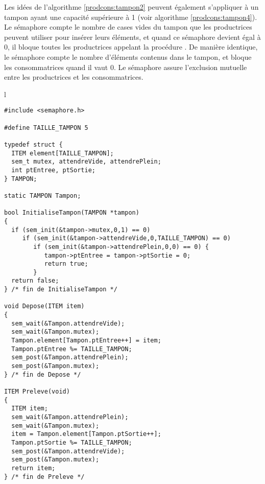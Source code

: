 Les idées de l'algorithme \ref{prodcons:tampon2} peuvent également s'appliquer à un tampon ayant une capacité supérieure à 1 (voir algorithme \ref{prodcons:tampon4}).
Le sémaphore  compte le nombre de cases vides du tampon que les productrices peuvent utiliser pour insérer leurs éléments, et quand ce sémaphore devient égal à 0, il bloque toutes les productrices appelant la procédure .
De manière identique, le sémaphore  compte le nombre d'éléments contenus dans le tampon, et bloque les consommatrices quand il vaut 0. Le sémaphore  assure l'exclusion mutuelle entre les productrices et les consommatrices.

\begin{algorithm}[!ht]
\caption{Extension de l'algorithme \ref{prodcons:tampon2}}\label{prodcons:tampon4}
\begin{center}
\begin{tabular}{l}
\lstset{language=C++}
\begin{lstlisting}
#include <semaphore.h>

#define TAILLE_TAMPON 5

typedef struct {
  ITEM element[TAILLE_TAMPON];
  sem_t mutex, attendreVide, attendrePlein;
  int ptEntree, ptSortie;
} TAMPON;

static TAMPON Tampon;

bool InitialiseTampon(TAMPON *tampon)
{
  if (sem_init(&tampon->mutex,0,1) == 0)
     if (sem_init(&tampon->attendreVide,0,TAILLE_TAMPON) == 0)
        if (sem_init(&tampon->attendrePlein,0,0) == 0) {
           tampon->ptEntree = tampon->ptSortie = 0;
           return true;
        }
  return false;
} /* fin de InitialiseTampon */

void Depose(ITEM item)
{
  sem_wait(&Tampon.attendreVide);
  sem_wait(&Tampon.mutex);
  Tampon.element[Tampon.ptEntree++] = item;
  Tampon.ptEntree %= TAILLE_TAMPON;
  sem_post(&Tampon.attendrePlein);
  sem_post(&Tampon.mutex);
} /* fin de Depose */

ITEM Preleve(void)
{
  ITEM item;
  sem_wait(&Tampon.attendrePlein);
  sem_wait(&Tampon.mutex);
  item = Tampon.element[Tampon.ptSortie++];
  Tampon.ptSortie %= TAILLE_TAMPON;
  sem_post(&Tampon.attendreVide);
  sem_post(&Tampon.mutex);
  return item;
} /* fin de Preleve */
\end{lstlisting}
\end{tabular}
\end{center}
\end{algorithm}

